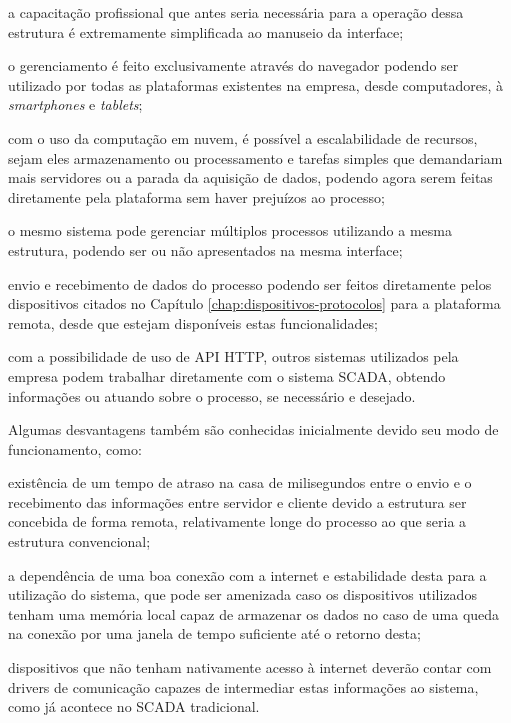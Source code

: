\begin{alineascomponto}
    \item a capacitação profissional que antes seria necessária para a operação dessa estrutura é extremamente simplificada ao manuseio da interface;
    \item o gerenciamento é feito exclusivamente através do navegador podendo ser utilizado por todas as plataformas existentes na empresa, desde computadores, à \textit{smartphones} e \textit{tablets};
    \item com o uso da computação em nuvem, é possível a escalabilidade de recursos, sejam eles armazenamento ou processamento e tarefas simples que demandariam mais servidores ou a parada da aquisição de dados, podendo agora serem feitas diretamente pela plataforma sem haver prejuízos ao processo;
    \item o mesmo sistema pode gerenciar múltiplos processos utilizando a mesma estrutura, podendo ser ou não apresentados na mesma interface;
    \item envio e recebimento de dados do processo podendo ser feitos diretamente pelos dispositivos citados no Capítulo \ref{chap:dispositivos-protocolos} para a plataforma remota, desde que estejam disponíveis estas funcionalidades;
    \item com a possibilidade de uso de \gls{API} \gls{HTTP}, outros sistemas utilizados pela empresa podem trabalhar diretamente com o sistema \gls{SCADA}, obtendo informações ou atuando sobre o processo, se necessário e desejado.
\end{alineascomponto}

Algumas desvantagens também são conhecidas inicialmente devido seu modo de funcionamento, como:

\begin{alineascomponto}
    \item existência de um tempo de atraso na casa de milisegundos entre o envio e o recebimento das informações entre servidor e cliente devido a estrutura ser concebida de forma remota, relativamente longe do processo ao que seria a estrutura convencional;
    \item a dependência de uma boa conexão com a internet e estabilidade desta para a utilização do sistema, que pode ser amenizada caso os dispositivos utilizados tenham uma memória local capaz de armazenar os dados no caso de uma queda na conexão por uma janela de tempo suficiente até o retorno desta;
    \item dispositivos que não tenham nativamente acesso à internet deverão contar com drivers de comunicação capazes de intermediar estas informações ao sistema, como já acontece no \gls{SCADA} tradicional.

\end{alineascomponto}

